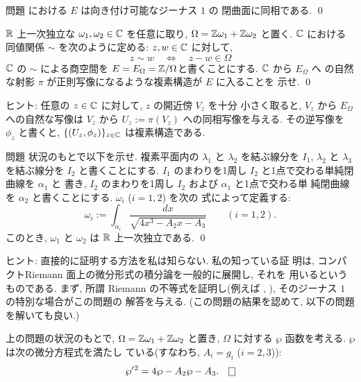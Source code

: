 \documentclass[12pt,twoside]{jarticle}
\def\pe{\wp}
\def\Z{{\Bbb Z}} %
\def\R{{\Bbb R}} %
\def\C{{\Bbb C}} %
\begin{document}
\begin{question}[平面曲線としての楕円曲線の位相]\label{q:top-ec}\qstar{*}
  問題  における $E$ は向き付け可能なジーナス $1$ の
  閉曲面に同相である. \qed
\end{question}

\begin{question}[$\C/\Omega$ としての楕円曲線]\label{q:torus-ec}\qstar{*}
  $\R$ 上一次独立な $\omega_1,\omega_2\in\C$ を任意に取り, %
  $\Omega=\Z\omega_1+\Z\omega_2$ と置く. $\C$ における同値関係 %
  $\sim$ を次のように定める: $z,w\in\C$ に対して,
  \[
    z \sim w
    \quad\Longleftrightarrow\quad
    z - w \in \Omega
  \] %
  $\C$ の $\sim$ による商空間を %
  $E = E_\Omega = \Z/\Omega$と書くことにする. $\C$ から $E_\Omega$ へ
  の自然な射影 $\pi$ が正則写像になるような複素構造が $E$ に入ることを
  示せ. \qed
\end{question}

\noindent ヒント: 任意の $z\in\C$ に対して, $z$ の開近傍 $V_z$ を十分
小さく取ると, $V_z$ から $E_\Omega$ への自然な写像は %
$V_z$ から $U_z := \pi(V_z)$ への同相写像を与える. その逆写像を %
$\phi_z$ と書くと, $\{(U_z,\phi_z)\}_{z\in\C}$ は複素構造である.

\begin{question}
  問題  状況のもとで以下を示せ. %
  複素平面内の $\lambda_1$ と $\lambda_2$ を結ぶ線分を $I_1$, %
  $\lambda_2$ と $\lambda_3$ を結ぶ線分を $I_2$ と書くことにする. 
  $I_1$ のまわりを1周し $I_2$ と1点で交わる単純閉曲線を $\alpha_1$ と
  書き, $I_2$ のまわりを1周し $I_2$ および $\alpha_1$ と1点で交わる単
  純閉曲線を $\alpha_2$ と書くことにする. $\omega_i$ ($i=1,2$) を次の
  式によって定義する:
  \[
    \omega_i := 
    \int_{\alpha_i} \frac{dx}{\sqrt{4x^3-A_2x-A_3}}
    \qquad
    (i=1,2).
  \]
  このとき, $\omega_1$ と $\omega_2$ は $\R$ 上一次独立である.
  \qed
\end{question}

\noindent ヒント: 直接的に証明する方法を私は知らない. 私の知っている証
明は, コンパクトRiemann 面上の微分形式の積分論を一般的に展開し, それを
用いるというものである. まず, 所謂 Riemann の不等式を証明し(例えば 
\cite{Iwasawa}, \cite{Gun}), そのジーナス $1$ の特別な場合がこの問題の
解答を与える. (この問題の結果を認めて, 以下の問題を解いても良い.)

\begin{question}\qstar{*}
  上の問題の状況のもとで, $\Omega=\Z\omega_1+\Z\omega_2$ と置き, 
  $\Omega$ に対する $\pe$ 函数を考える. $\pe$ は次の微分方程式を満たし
  ている(すなわち, $A_i=g_i$ ($i=2,3$)):
  \[
    \pe'{}^2 = 4\pe - A_2 \pe - A_3. \qed
  \]
\end{question}
\end{document}

